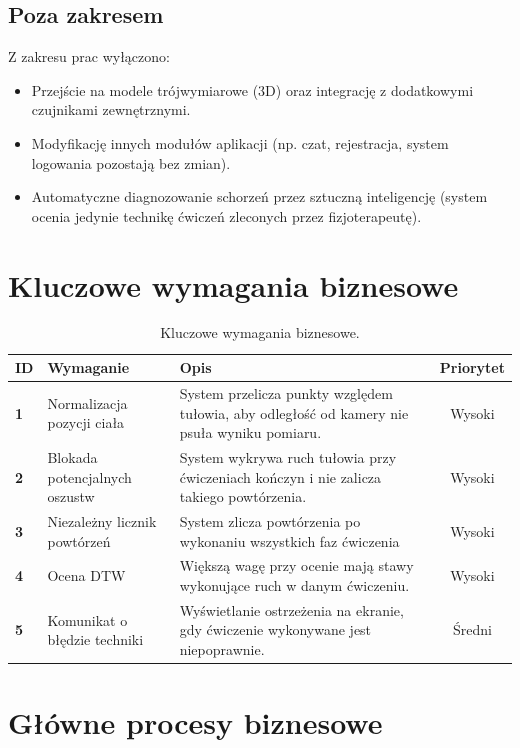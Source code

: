 \documentclass[11pt,a4paper]{article}
\begin{document}
\subsection{Poza zakresem}
Z zakresu prac wyłączono:
\begin{itemize}
    \item Przejście na modele trójwymiarowe (3D) oraz integrację z dodatkowymi czujnikami zewnętrznymi.
    \item Modyfikację innych modułów aplikacji (np. czat, rejestracja, system logowania pozostają bez zmian).
    \item Automatyczne diagnozowanie schorzeń przez sztuczną inteligencję (system ocenia jedynie technikę ćwiczeń zleconych przez fizjoterapeutę).
\end{itemize}

\section{Kluczowe wymagania biznesowe}
\begin{table}[ht]
\centering
\small
\begin{tabularx}{\textwidth}{l p{4.5cm} Y c}
\toprule
\textbf{ID} & \textbf{Wymaganie} & \textbf{Opis} & \textbf{Priorytet} \\
\midrule
\textbf{1} & Normalizacja pozycji ciała & System przelicza punkty względem tułowia, aby odległość od kamery nie psuła wyniku pomiaru. & Wysoki \\
\textbf{2} & Blokada potencjalnych oszustw & System wykrywa ruch tułowia przy ćwiczeniach kończyn i nie zalicza takiego powtórzenia. & Wysoki \\
\textbf{3} & Niezależny licznik powtórzeń & System zlicza powtórzenia po wykonaniu wszystkich faz ćwiczenia & Wysoki \\
\textbf{4} & Ocena DTW & Większą wagę przy ocenie mają stawy wykonujące ruch w danym ćwiczeniu. & Wysoki \\
\textbf{5} & Komunikat o błędzie techniki & Wyświetlanie ostrzeżenia na ekranie, gdy ćwiczenie wykonywane jest niepoprawnie. & Średni \\
\bottomrule
\end{tabularx}
\caption{Kluczowe wymagania biznesowe.}
\end{table}

\section{Główne procesy biznesowe}
\end{document}
